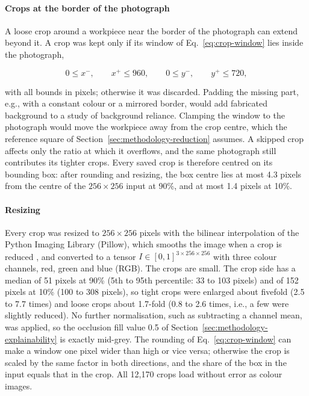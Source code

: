 \paragraph{Crops at the border of the photograph}
A loose crop around a workpiece near the border of the photograph can extend beyond
it. A crop was kept only if its window of Eq.~\eqref{eq:crop-window} lies inside the
photograph,

\begin{equation}
0 \le x^-, \qquad x^+ \le 960, \qquad 0 \le y^-, \qquad y^+ \le 720,
\label{eq:crop-inside}
\end{equation}

with all bounds in pixels; otherwise it was discarded. Padding the missing part, e.g.,
with a constant colour or a mirrored border, would add fabricated background to a
study of background reliance. Clamping the window to the photograph would move the
workpiece away from the crop centre, which the reference square of
Section~\ref{sec:methodology-reduction} assumes. A skipped crop affects only the
ratio at which it overflows, and the same photograph still contributes its tighter
crops. Every saved crop is therefore centred on its bounding box: after rounding and
resizing, the box centre lies at most 4.3 pixels from the centre of the
$256 \times 256$ input at 90\%, and at most 1.4 pixels at 10\%.

\paragraph{Resizing}
Every crop was resized to $256 \times 256$ pixels with the bilinear interpolation of
the Python Imaging Library (Pillow), which smooths the image when a crop is reduced \citep{pillow2025docs}, and converted to a tensor
$I \in [0,1]^{3 \times 256 \times 256}$ with three colour channels, red, green and
blue (RGB). The crops are small. The crop side has a median of 51 pixels at 90\%
(5th to 95th percentile: 33 to 103 pixels) and of 152 pixels at 10\% (100 to 308
pixels), so tight crops were enlarged about fivefold (2.5 to 7.7 times) and loose
crops about 1.7-fold (0.8 to 2.6 times, i.e., a few were slightly reduced). No further
normalisation, such as subtracting a channel mean, was applied, so the occlusion fill
value 0.5 of Section~\ref{sec:methodology-explainability} is exactly mid-grey. The
rounding of Eq.~\eqref{eq:crop-window} can make a window one pixel wider than high or
vice versa; otherwise the crop is scaled by the same factor in both directions, and
the share of the box in the input equals that in the crop. All 12,170 crops load
without error as colour images.

